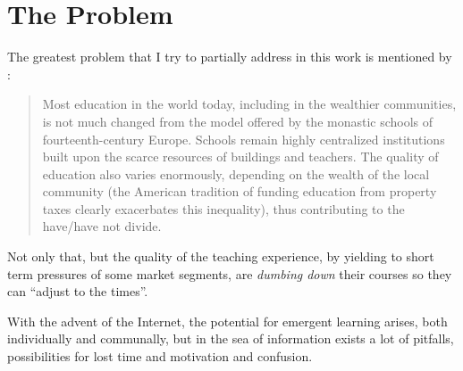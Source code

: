 \section{The Problem}

The greatest problem that I try to partially address in this work
is mentioned by \cite{futurism:kurzweil_singularity_is_near}:

\begin{quotation}
    Most education in the world today, including in the wealthier communities,
    is not much changed from the model offered by the monastic schools of
    fourteenth-century Europe. Schools remain highly centralized institutions
    built upon the scarce resources of buildings and teachers. The quality of
    education also varies enormously, depending on the wealth of the local
    community (the American tradition of funding education from property taxes
    clearly exacerbates this inequality), thus contributing to the have/have not
    divide.
\end{quotation}

Not only that, but the quality of the teaching experience, by yielding to short
term pressures of some market segments, are \emph{dumbing down} their courses so
they can ``adjust to the times''. \cite{education:spolsky__the_perils_of_java_schools}

With the advent of the Internet,  the potential for emergent learning arises,
both individually and communally, but in the sea of information exists a lot of
pitfalls, possibilities for lost time and motivation and confusion.


